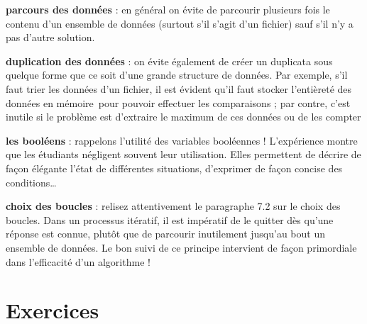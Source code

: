 \begin{liste}
	\item 
		\textbf{parcours des données} : en général on évite de parcourir
		plusieurs fois le contenu d’un ensemble de données (surtout s’il s’agit
		d’un fichier) sauf s’il n’y a pas d’autre solution.
	\item 
		\textbf{duplication des données} : on évite également de créer un
		duplicata sous quelque forme que ce soit d’une grande structure de
		données. Par exemple, s’il faut trier les données d’un fichier, il est
		évident qu’il faut stocker l’entièreté des données en mémoire~pour
		pouvoir effectuer les comparaisons ; par contre, c’est inutile si le
		problème est d’extraire le maximum de ces données ou de les compter
	\item 
		\textbf{les booléens} : rappelons l’utilité des variables booléennes !
		L’expérience montre que les étudiants négligent souvent leur
		utilisation. Elles permettent de décrire de façon élégante l’état de
		différentes situations, d’exprimer de façon concise des conditions…
	\item 
		\textbf{choix des boucles} : relisez attentivement le paragraphe 7.2 sur
		le choix des boucles. Dans un processus itératif, il est impératif de
		le quitter dès qu’une réponse est connue, plutôt que de parcourir
		inutilement jusqu’au bout un ensemble de données. Le bon suivi de ce
		principe intervient de façon primordiale dans l’efficacité d’un
		algorithme ! 
\end{liste}


\section{Exercices}

